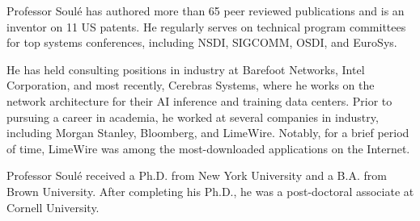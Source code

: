 \documentclass[11pt]{article}
\begin{document}

Professor Soul\'{e} has authored more than 65 peer reviewed publications and is
an inventor on 11 US patents. He regularly serves on technical program committees for top systems
conferences, including NSDI, SIGCOMM, OSDI, and EuroSys. %


He has held consulting positions in industry at Barefoot Networks,
Intel Corporation, and most recently, Cerebras Systems, where he works
on the network architecture for their AI inference and training data
centers.  Prior to pursuing a career in academia, he worked at several
companies in industry, including Morgan Stanley, Bloomberg, and
LimeWire. Notably, for a brief period of time, LimeWire was among the
most-downloaded applications on the Internet.


Professor Soul\'{e} received a Ph.D. from New York University and a
B.A. from Brown University. After completing his Ph.D., he was a
post-doctoral associate at Cornell University.
\end{document}

